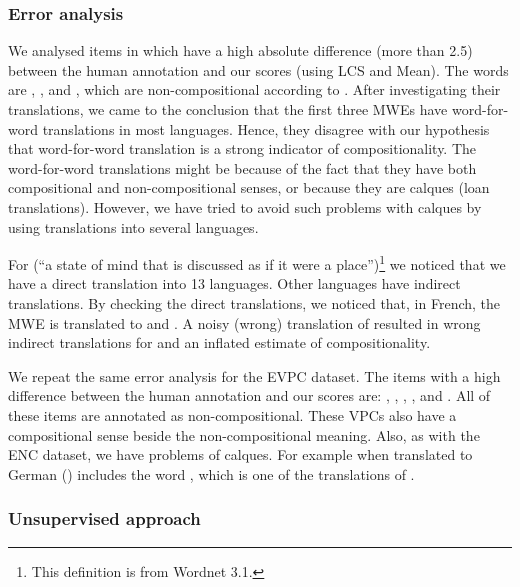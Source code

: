 \documentclass[output=paper
,modfonts
,nonflat]{langsci/langscibook}
\begin{document}
\subsubsection{Error analysis}
\label{sec:ss:erroranalysis}

We analysed items in \REDDY which have a high absolute difference (more than
2.5) between the human annotation and our scores (using LCS and
Mean). The words are , ,
 and , which are
non-compositional according to \REDDY. After investigating their
translations, we came to the conclusion that the first three MWEs have
word-for-word translations in most languages. Hence, they disagree
with our hypothesis that word-for-word translation is a strong
indicator of compositionality.  The word-for-word translations might
be because of the fact that they have both compositional and
non-compositional senses, or because they are calques (loan
translations). However, we have tried to avoid such problems with
calques by using translations into several languages.

For  (``a state of mind that is discussed as if it
were a place'')\footnote{This definition is from Wordnet 3.1.} we
noticed that we have a direct translation into 13 languages. Other
languages have indirect translations. By checking the direct
translations, we noticed that, in French, the MWE is translated to
 and . A noisy (wrong) translation of
  resulted in wrong indirect translations for
 and an inflated estimate of compositionality.

We repeat the same error analysis for the EVPC dataset. The items with
a high difference between the human annotation and our scores are:
, , ,
,  and . All
of these items are annotated as non-compositional. These VPCs also
have a compositional sense beside the non-compositional meaning. Also,
as with the ENC dataset, we have problems of calques. For example
 when translated to German ()
includes the word , which is one of the translations of
.

\subsubsection{Unsupervised approach}
\label{sec:ch4-1:unsupervised}
\end{document}

